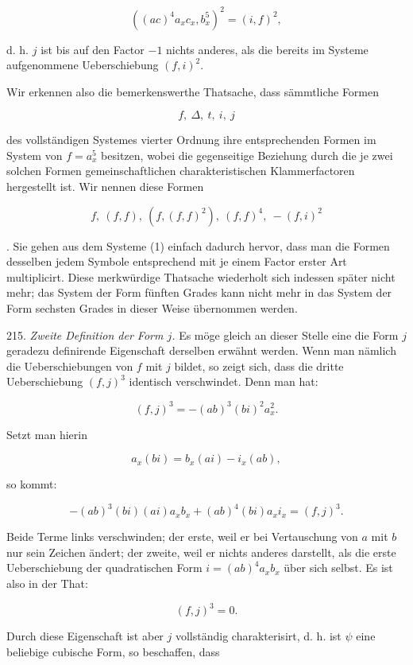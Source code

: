 \documentclass[11pt]{article}
\providecommand{\gesperrt}[1]{\textls[130]{#1}}
\providecommand{\weberpage}[1]{}
\providecommand{\weq}[2]{\begin{equation}\tag{#1}#2\end{equation}}
\let\Delta\varDelta
\begin{document}
\[ ((ac)^4 a_x c_x, b_x^5)^2 = (i, f)^2, \]


\weberpage{242}

d. h. $j$ ist bis auf den Factor $-1$ nichts anderes, als die bereits im
Systeme aufgenommene Ueberschiebung $(f, i)^2$.

Wir erkennen also die bemerkenswerthe Thatsache, dass sämmtliche
Formen

\weq{1}{f, \ \Delta, \ t, \ i, \ j}

des vollständigen Systemes vierter Ordnung ihre entsprechenden
Formen im System von $f = a_x^5$ besitzen, wobei die gegenseitige Beziehung
 durch die je zwei solchen Formen gemeinschaftlichen charakteristischen
 Klammerfactoren hergestellt ist. Wir nennen diese Formen

\weq{2}{f, \ (f, f), \ (f, (f, f)^2), \ (f, f)^4, \ -(f, i)^2}

\gesperrt{übernommene Formen}. Sie gehen aus dem Systeme (1) einfach
dadurch hervor, dass man die Formen desselben jedem Symbole entsprechend
 mit je einem Factor erster Art multiplicirt. Diese merkwürdige
 Thatsache wiederholt sich indessen später nicht mehr; das
System der Form fünften Grades kann nicht mehr in das System der
Form sechsten Grades in dieser Weise übernommen werden.

215. \textit{Zweite Definition der Form $j$.} Es möge gleich an dieser
Stelle eine die Form $j$ geradezu definirende Eigenschaft derselben
erwähnt werden. Wenn man nämlich die Ueberschiebungen von $f$ mit
$j$ bildet, so zeigt sich, dass die dritte Ueberschiebung $(f, j)^3$ identisch
verschwindet. Denn man hat:

\[ (f, j)^3 = -(ab)^3 (bi)^2 a_x^2. \]

Setzt man hierin

\[ a_x (bi) = b_x (ai) - i_x (ab), \]

so kommt:

\[ -(ab)^3 (bi) (ai) a_x b_x + (ab)^4 (bi) a_x i_x = (f, j)^3. \]

Beide Terme links verschwinden; der erste, weil er bei Vertauschung
von $a$ mit $b$ nur sein Zeichen ändert; der zweite, weil er nichts anderes
 darstellt, als die erste Ueberschiebung der quadratischen Form
$i = (ab)^4 a_x b_x$ über sich selbst. Es ist also in der That:

\[ (f, j)^3 = 0. \]

Durch diese Eigenschaft ist aber $j$ vollständig charakterisirt, d. h.
ist $\psi$ eine beliebige cubische Form, so beschaffen, dass
\end{document}
